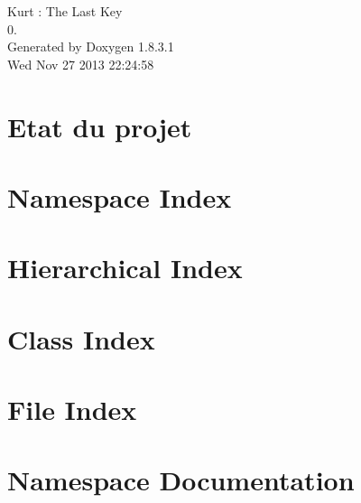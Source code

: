 \documentclass{book}
\begin{document}
\hypersetup{pageanchor=false,citecolor=blue}
\begin{titlepage}
\vspace*{7cm}
\begin{center}
{\Large Kurt \-: The Last Key \\[1ex]\large 0. }\\
\vspace*{1cm}
{\large Generated by Doxygen 1.8.3.1}\\
\vspace*{0.5cm}
{\small Wed Nov 27 2013 22:24:58}\\
\end{center}
\end{titlepage}
\clearemptydoublepage
{}
\tableofcontents
\clearemptydoublepage
{}
\hypersetup{pageanchor=true,citecolor=blue}
\chapter{Etat du projet}
\label{index}\hypertarget{index}{}
\chapter{Namespace Index}

\chapter{Hierarchical Index}

\chapter{Class Index}

\chapter{File Index}

\chapter{Namespace Documentation}



\end{document}
